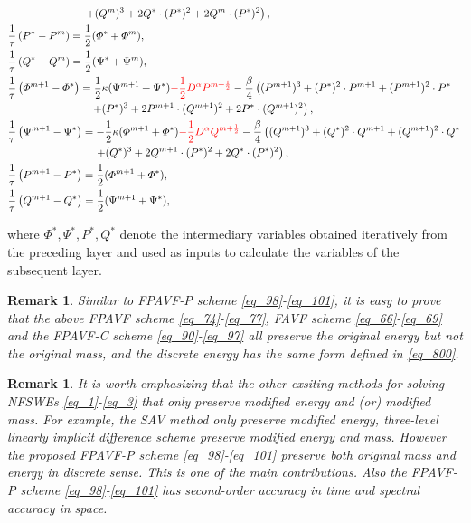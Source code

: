 \documentclass[preprint,compress,3p,10pt,fleqn]{elsarticle}
\numberwithin{equation}{section}
\newtheorem{remark}[theorem]{Remark}
\begin{document}
\begin{enumerate}[$\bullet$]
\begin{align}
		&~~~~~~~~~~~~~~~~~~~~~\left.+ (Q^{m})^{3}+2 Q^{*}\cdot (P^{*})^{2}+2 Q^{m}\cdot (P^{*})^{2}\right),\label{eq_91}\\
&\frac{1}{\tau}\left(P^{*}-P^{m}\right)=\frac{1}{2}(\varPhi^{*}+\varPhi^{m}),\label{eq_92}\\
&\frac{1}{\tau}\left(Q^{*}-Q^{m}\right)=\frac{1}{2}(\Psi^{*}+\Psi^{m}),\label{eq_93}\\
&\frac{1}{\tau}\left(\varPhi^{m+1}-\varPhi^{*}\right)=\frac{1}{2}\kappa (\Psi^{m+1}+\Psi^{*})\textcolor[rgb]{1.00,0.00,0.00}{-\frac{1}{2}D^{\alpha} P^{m+\frac{1}{2}}}-\frac{\beta}{4}\left((P^{m+1})^3+(P^{*})^{2}\cdot P^{m+1}+(P^{m+1})^{2}\cdot P^{*}\right.\nonumber\\
		&~~~~~~~~~~~~~~~~~~~~~~~\left.+ (P^{*})^{3}+2 P^{m+1}\cdot (Q^{m+1})^{2}+2 P^{*}\cdot (Q^{m+1})^{2}\right),\label{eq_94}\\
&\frac{1}{\tau}\left(\Psi^{m+1}-\Psi^{*}\right)=-\frac{1}{2}\kappa (\varPhi^{m+1}+\varPhi^{*})\textcolor[rgb]{1.00,0.00,0.00}{-\frac{1}{2}D^{\alpha} Q^{m+\frac{1}{2}}}-\frac{\beta}{4}\left((Q^{m+1})^3+(Q^{*})^{2}\cdot Q^{m+1}+(Q^{m+1})^{2}\cdot Q^{*}\right.\nonumber\\
		&~~~~~~~~~~~~~~~~~~~~~~~~\left.+ (Q^{*})^{3}+2 Q^{m+1}\cdot (P^{*})^{2}+2 Q^{*}\cdot (P^{*})^{2}\right),\label{eq_95}\\
&\frac{1}{\tau}\left(P^{m+1}-P^{*}\right)=\frac{1}{2}(\varPhi^{m+1}+\varPhi^{*}),\label{eq_96}\\
&\frac{1}{\tau}\left(Q^{m+1}-Q^{*}\right)=\frac{1}{2}(\Psi^{m+1}+\Psi^{*}),\label{eq_97}
\end{align}
\end{enumerate}
 where $\Phi^*, \Psi^*, P^*, Q^*$ denote the intermediary variables obtained iteratively from the preceding layer and used as inputs to calculate the variables of the subsequent layer.

\begin{remark}\label{rmk1}
Similar to FPAVF-P scheme \eqref{eq_98}-\eqref{eq_101}, it is easy to prove that the above FPAVF scheme \eqref{eq_74}-\eqref{eq_77}, FAVF scheme \eqref{eq_66}-\eqref{eq_69} and the FPAVF-C scheme \eqref{eq_90}-\eqref{eq_97} all preserve the original energy but not the original mass, and the discrete energy has the same form defined in \eqref{eq_800}.
\end{remark}

\begin{remark}\label{rmk2}
It is worth emphasizing that the other exsiting methods for solving NFSWEs \eqref{eq_1}-\eqref{eq_3} that only preserve modified energy and (or) modified mass. For example, the SAV method \cite{chengConvergenceEnergyconservingScheme2022} only preserve modified energy, three-level linearly implicit difference scheme \cite{ranLinearlyImplicitConservative2016} preserve modified energy and mass. However the proposed FPAVF-P scheme \eqref{eq_98}-\eqref{eq_101} preserve both original mass and energy in discrete sense. This is one of the main contributions. Also the FPAVF-P scheme \eqref{eq_98}-\eqref{eq_101} has second-order accuracy in time and spectral accuracy in space.
\end{remark}
\end{document}
